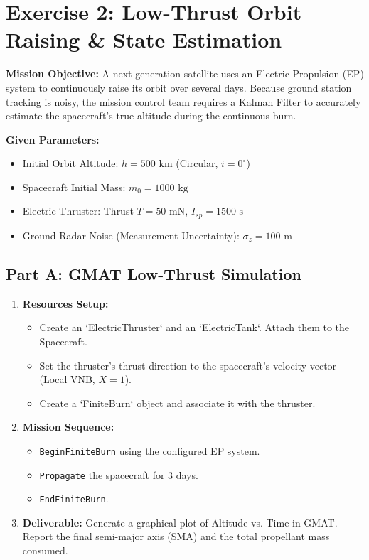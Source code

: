 \documentclass[11pt, letterpaper]{article}
\begin{document}
\section*{Exercise 2: Low-Thrust Orbit Raising \& State Estimation}
\textbf{Mission Objective:} A next-generation satellite uses an Electric Propulsion (EP) system to continuously raise its orbit over several days. Because ground station tracking is noisy, the mission control team requires a Kalman Filter to accurately estimate the spacecraft's true altitude during the continuous burn.

\textbf{Given Parameters:}
\begin{itemize}
    \item Initial Orbit Altitude: $h = 500 \text{ km}$ (Circular, $i=0^\circ$)
    \item Spacecraft Initial Mass: $m_0 = 1000 \text{ kg}$
    \item Electric Thruster: Thrust $T = 50 \text{ mN}$, $I_{sp} = 1500 \text{ s}$
    \item Ground Radar Noise (Measurement Uncertainty): $\sigma_z = 100 \text{ m}$
\end{itemize}

\subsection*{Part A: GMAT Low-Thrust Simulation}
\begin{enumerate}
    \item \textbf{Resources Setup:} 
        \begin{itemize}
            \item Create an `ElectricThruster` and an `ElectricTank`. Attach them to the Spacecraft. 
            \item Set the thruster's thrust direction to the spacecraft's velocity vector (Local VNB, $X=1$).
            \item Create a `FiniteBurn` object and associate it with the thruster.
        \end{itemize}
    \item \textbf{Mission Sequence:}
        \begin{itemize}
            \item \texttt{BeginFiniteBurn} using the configured EP system.
            \item \texttt{Propagate} the spacecraft for 3 days.
            \item \texttt{EndFiniteBurn}.
        \end{itemize}
    \item \textbf{Deliverable:} Generate a graphical plot of Altitude vs. Time in GMAT. Report the final semi-major axis (SMA) and the total propellant mass consumed.
\end{enumerate}
\end{document}
